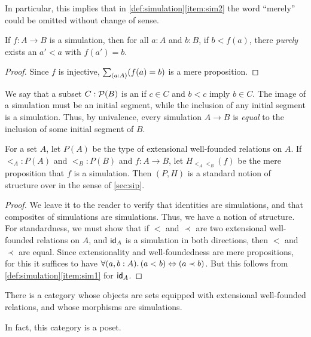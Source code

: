 In particular, this implies that in \autoref{def:simulation}\ref{item:sim2} the word ``merely'' could be omitted without change of sense.

\begin{cor}
  If $f:A\to B$ is a simulation, then for all $a:A$ and $b:B$, if $b<f(a)$, there \emph{purely} exists an $a'<a$ with $f(a')=b$.
\end{cor}
\begin{proof}
  Since $f$ is injective, $\sm{a:A} (f(a)=b)$ is a mere proposition.
\end{proof}

We say that a subset $C :\power B$ is an 
%
%
if $c\in C$ and $b<c$ imply $b\in C$.
The image of a simulation must be an initial segment, while the inclusion of any initial segment is a simulation.
Thus, by univalence, every simulation $A\to B$ is \emph{equal} to the inclusion of some initial segment of $B$.

\begin{thm}
  For a set $A$, let $P(A)$ be the type of extensional well-founded relations on $A$.
  If $\mathord{<_A} : P(A)$ and $\mathord{<_B} : P(B)$ and $f:A\to B$, let $H_{\mathord{<_A}\mathord{<_B}}(f)$ be the mere proposition that $f$ is a simulation.
  Then $(P,H)$ is a standard notion of structure over \uset in the sense of \autoref{sec:sip}.
\end{thm}
\begin{proof}
  We leave it to the reader to verify that identities are simulations, and that composites of simulations are simulations.
  Thus, we have a notion of structure.
  For standardness, we must show that if $<$ and $\prec$ are two extensional well-founded relations on $A$, and $\idfunc[A]$ is a simulation in both directions, then $<$ and $\prec$ are equal.
  Since extensionality and well-foundedness are mere propositions, for this it suffices to have $\fall{a,b:A} (a<b) \Leftrightarrow (a\prec b)$.
  But this follows from \autoref{def:simulation}\ref{item:sim1} for $\idfunc[A]$.
\end{proof}

\begin{cor}\label{thm:wfcat}
  There is a category whose objects are sets equipped with extensional well-founded relations, and whose morphisms are simulations.
\end{cor}

In fact, this category is a poset.

